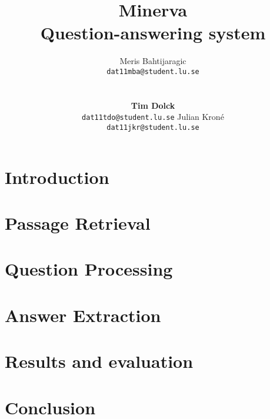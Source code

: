 \documentclass[11pt,letterpaper]{article}
\title{Minerva \\ Question-answering system}
\author{Meris Bahtijaragic\\
	    {\tt dat11mba@student.lu.se}
	    \And
      \\
      \\
      \\
      \textbf{Tim Dolck}\\
      {\tt dat11tdo@student.lu.se}
      \And
      Julian Kron\'{e}\\
      {\tt dat11jkr@student.lu.se}
}
\date{}
\begin{document}
\maketitle
\begin{abstract}

\end{abstract}
\section{Introduction}

\section{Passage Retrieval}

\section{Question Processing}

\section{Answer Extraction}

\section{Results and evaluation}

\section{Conclusion}





\end{document}
